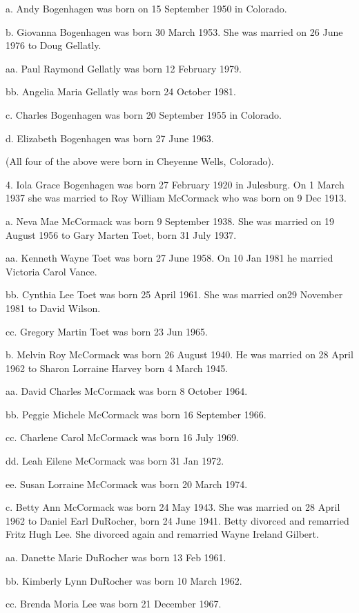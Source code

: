\documentclass[a4paper]{article}
\begin{document}
a. Andy Bogenhagen was born on 15 September 1950 in Colorado.

b. Giovanna Bogenhagen was born 30 March 1953. She was married on 26 June 1976 to Doug Gellatly.

aa. Paul Raymond Gellatly was born 12 February 1979.

bb. Angelia Maria Gellatly was born 24 October 1981.

c. Charles Bogenhagen was born 20 September 1955 in Colorado.

d. Elizabeth Bogenhagen was born 27 June 1963.

(All four of the above were born in Cheyenne Wells, Colorado).

4. Iola Grace Bogenhagen was born 27 February 1920 in Julesburg.  On 1 March 1937 she was married to Roy William McCormack who was born on  9 Dec 1913.

a. Neva Mae McCormack was born 9 September 1938. She was married on 19 August 1956 to Gary Marten Toet, born 31 July 1937.

aa. Kenneth Wayne Toet was born 27 June 1958.  On 10 Jan 1981 he married Victoria Carol Vance.

bb. Cynthia Lee Toet was born 25 April 1961.  She was married on29 November 1981 to David Wilson.

cc. Gregory Martin Toet was born 23 Jun 1965.

b. Melvin Roy McCormack was born 26 August 1940.  He was married on 28 April 1962 to Sharon Lorraine Harvey born 4 March 1945.

aa. David Charles McCormack was born 8 October 1964.

bb. Peggie Michele McCormack was born 16 September 1966.

cc. Charlene Carol McCormack was born 16 July 1969.

dd. Leah Eilene McCormack was born 31 Jan 1972.

ee. Susan Lorraine McCormack was born 20 March 1974.

c. Betty Ann McCormack was born 24 May 1943.  She was married on 28 April 1962 to Daniel Earl DuRocher, born 24 June 1941.  Betty divorced and remarried Fritz Hugh Lee. She divorced again and remarried Wayne Ireland Gilbert. 

aa. Danette Marie DuRocher was born 13 Feb 1961.

bb. Kimberly Lynn DuRocher was born 10 March 1962.

cc. Brenda Moria Lee was born 21 December 1967.
\end{document}

